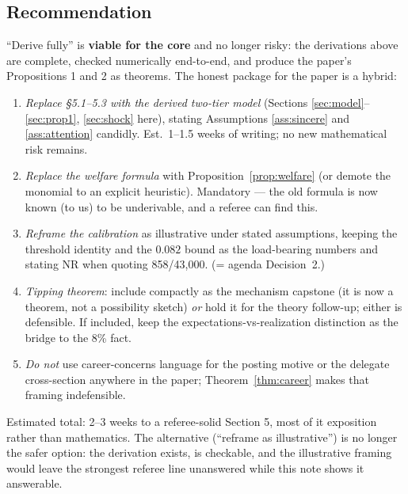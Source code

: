 \documentclass[11pt]{article}
\theoremstyle{remark}
\begin{document}
\subsection*{Recommendation}
``Derive fully'' is \textbf{viable for the core} and no longer risky: the
derivations above are complete, checked numerically end-to-end, and produce the
paper's Propositions 1 and 2 as theorems. The honest package for the paper is a
hybrid:
\begin{enumerate}[itemsep=1pt]
\item \emph{Replace \S5.1--5.3 with the derived two-tier model} (Sections
\ref{sec:model}--\ref{sec:prop1}, \ref{sec:shock} here), stating Assumptions
\ref{ass:sincere} and \ref{ass:attention} candidly. Est.\ 1--1.5 weeks of
writing; no new mathematical risk remains.
\item \emph{Replace the welfare formula} with Proposition~\ref{prop:welfare}
(or demote the monomial to an explicit heuristic). Mandatory --- the old formula
is now known (to us) to be underivable, and a referee can find this.
\item \emph{Reframe the calibration} as illustrative under stated assumptions,
keeping the threshold identity and the $0.082$ bound as the load-bearing
numbers and stating NR when quoting 858/43{,}000. (= agenda Decision~2.)
\item \emph{Tipping theorem}: include compactly as the mechanism capstone
(it is now a theorem, not a possibility sketch) \emph{or} hold it for the
theory follow-up; either is defensible. If included, keep the
expectations-vs-realization distinction as the bridge to the 8\% fact.
\item \emph{Do not} use career-concerns language for the posting motive or the
delegate cross-section anywhere in the paper; Theorem~\ref{thm:career} makes
that framing indefensible.
\end{enumerate}
Estimated total: 2--3 weeks to a referee-solid Section 5, most of it exposition
rather than mathematics. The alternative (``reframe as illustrative'') is no
longer the safer option: the derivation exists, is checkable, and the
illustrative framing would leave the strongest referee line unanswered while
this note shows it answerable.
\end{document}
